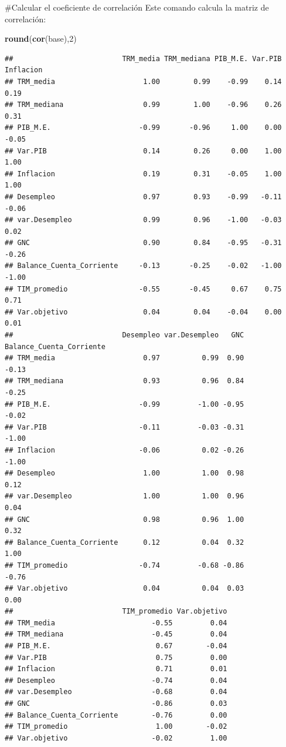 \documentclass[
  11pt,
]{article}
\newenvironment{Shaded}{\begin{snugshade}}{\end{snugshade}}
\newcommand{\DecValTok}[1]{\textcolor[rgb]{0.00,0.00,0.81}{#1}}
\newcommand{\KeywordTok}[1]{\textcolor[rgb]{0.13,0.29,0.53}{\textbf{#1}}}
\newcommand{\NormalTok}[1]{#1}
\begin{document}
\#Calcular el coeficiente de correlación Este comando calcula la matriz
de correlación:

\begin{Shaded}
\begin{Highlighting}[]
\KeywordTok{round}\NormalTok{(}\KeywordTok{cor}\NormalTok{(base),}\DecValTok{2}\NormalTok{)  }
\end{Highlighting}
\end{Shaded}

\begin{verbatim}
##                          TRM_media TRM_mediana PIB_M.E. Var.PIB Inflacion
## TRM_media                     1.00        0.99    -0.99    0.14      0.19
## TRM_mediana                   0.99        1.00    -0.96    0.26      0.31
## PIB_M.E.                     -0.99       -0.96     1.00    0.00     -0.05
## Var.PIB                       0.14        0.26     0.00    1.00      1.00
## Inflacion                     0.19        0.31    -0.05    1.00      1.00
## Desempleo                     0.97        0.93    -0.99   -0.11     -0.06
## var.Desempleo                 0.99        0.96    -1.00   -0.03      0.02
## GNC                           0.90        0.84    -0.95   -0.31     -0.26
## Balance_Cuenta_Corriente     -0.13       -0.25    -0.02   -1.00     -1.00
## TIM_promedio                 -0.55       -0.45     0.67    0.75      0.71
## Var.objetivo                  0.04        0.04    -0.04    0.00      0.01
##                          Desempleo var.Desempleo   GNC Balance_Cuenta_Corriente
## TRM_media                     0.97          0.99  0.90                    -0.13
## TRM_mediana                   0.93          0.96  0.84                    -0.25
## PIB_M.E.                     -0.99         -1.00 -0.95                    -0.02
## Var.PIB                      -0.11         -0.03 -0.31                    -1.00
## Inflacion                    -0.06          0.02 -0.26                    -1.00
## Desempleo                     1.00          1.00  0.98                     0.12
## var.Desempleo                 1.00          1.00  0.96                     0.04
## GNC                           0.98          0.96  1.00                     0.32
## Balance_Cuenta_Corriente      0.12          0.04  0.32                     1.00
## TIM_promedio                 -0.74         -0.68 -0.86                    -0.76
## Var.objetivo                  0.04          0.04  0.03                     0.00
##                          TIM_promedio Var.objetivo
## TRM_media                       -0.55         0.04
## TRM_mediana                     -0.45         0.04
## PIB_M.E.                         0.67        -0.04
## Var.PIB                          0.75         0.00
## Inflacion                        0.71         0.01
## Desempleo                       -0.74         0.04
## var.Desempleo                   -0.68         0.04
## GNC                             -0.86         0.03
## Balance_Cuenta_Corriente        -0.76         0.00
## TIM_promedio                     1.00        -0.02
## Var.objetivo                    -0.02         1.00
\end{verbatim}
\end{document}
